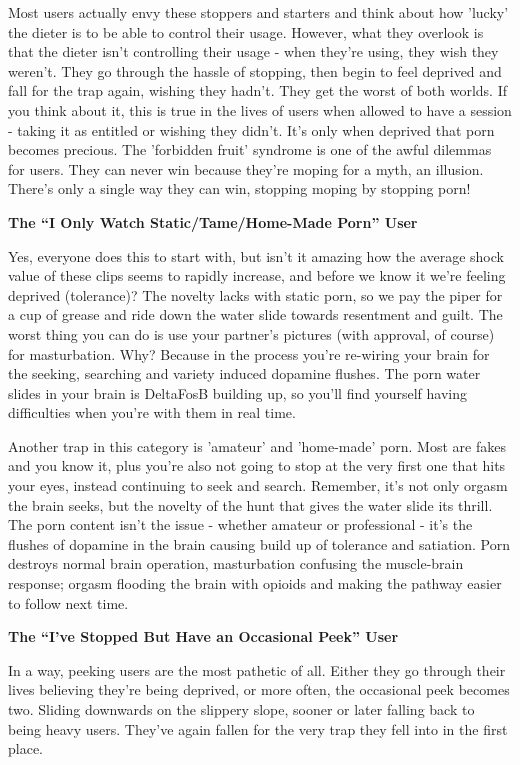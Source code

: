 \documentclass[
]{book}
\begin{document}
Most users actually envy these stoppers and starters and think about how 'lucky' the dieter is to be able to control their usage. However, what they overlook is that the dieter isn't controlling their usage - when they're using, they wish they weren't. They go through the hassle of stopping, then begin to feel deprived and fall for the trap again, wishing they hadn't. They get the worst of both worlds. If you think about it, this is true in the lives of users when allowed to have a session - taking it as entitled or wishing they didn't. It's only when deprived that porn becomes precious. The 'forbidden fruit' syndrome is one of the awful dilemmas for users. They can never win because they're moping for a myth, an illusion. There's only a single way they can win, stopping moping by stopping porn!

\textbf{The ``I Only Watch Static/Tame/Home-Made Porn'' User}

Yes, everyone does this to start with, but isn't it amazing how the average shock value of these clips seems to rapidly increase, and before we know it we're feeling deprived (tolerance)? The novelty lacks with static porn, so we pay the piper for a cup of grease and ride down the water slide towards resentment and guilt. The worst thing you can do is use your partner's pictures (with approval, of course) for masturbation. Why? Because in the process you're re-wiring your brain for the seeking, searching and variety induced dopamine flushes. The porn water slides in your brain is DeltaFosB building up, so you'll find yourself having difficulties when you're with them in real time.

Another trap in this category is 'amateur' and 'home-made' porn. Most are fakes and you know it, plus you're also not going to stop at the very first one that hits your eyes, instead continuing to seek and search. Remember, it's not only orgasm the brain seeks, but the novelty of the hunt that gives the water slide its thrill. The porn content isn't the issue - whether amateur or professional - it's the flushes of dopamine in the brain causing build up of tolerance and satiation. Porn destroys normal brain operation, masturbation confusing the muscle-brain response; orgasm flooding the brain with opioids and making the pathway easier to follow next time.

\textbf{The ``I've Stopped But Have an Occasional Peek'' User}

In a way, peeking users are the most pathetic of all. Either they go through their lives believing they're being deprived, or more often, the occasional peek becomes two. Sliding downwards on the slippery slope, sooner or later falling back to being heavy users. They've again fallen for the very trap they fell into in the first place.
\end{document}
